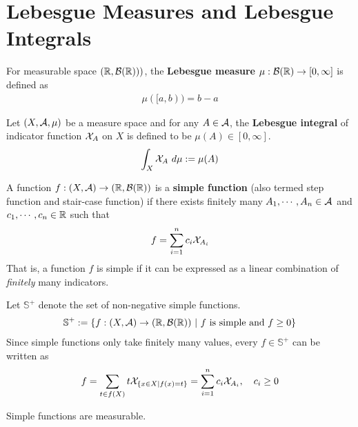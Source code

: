\documentclass[11pt]{article}
\numberwithin{equation}{section}
\begin{document}
	\section{Lebesgue Measures and Lebesgue Integrals}
	\begin{definition}
	    For measurable space $(\mathbb{R}, \mathcal{{B}}(\mathbb{R})))$, the \textbf{Lebesgue measure} $\mu: \mathcal{{B}}(\mathbb{R}) \to [0, \infty]$ is defined as
	    \begin{align}
	        \mu([a, b)) = b - a
	    \end{align}
	\end{definition}
	
	\begin{definition}
		Let $(X, \mathcal{{A}}, \mu)$ be a measure space and for any $A \in \mathcal{{A}}$, the \textbf{Lebesgue integral} of indicator function $\mathcal{{X}}_A$ on $X$ is defined to be $\mu(A) \in [0, \infty]$.
		\begin{align}
			\int_X \mathcal{{X}}_A\ d\mu := \mu(A)
		\end{align}
	\end{definition}
	
	\begin{definition}
		A function $f: (X, \mathcal{{A}}) \to (\mathbb{R}, \mathcal{{B}}(\mathbb{R}))$ is a \textbf{simple function} (also termed step function and stair-case function) if there exists finitely many $A_1, \cdots, A_n \in \mathcal{{A}}$ and $c_1, \cdots, c_n \in \mathbb{R}$ such that
		\begin{align}
			f = \sum_{i=1}^n c_i \mathcal{{X}}_{A_i}
		\end{align}
		That is, a function $f$ is simple if it can be expressed as a linear combination of \emph{finitely} many indicators.
		
		Let $\mathbb{S}^+$ denote the set of non-negative simple functions.
		\begin{align}
			\mathbb{S}^+ := \left\{
				f: (X, \mathcal{{A}}) \to (\mathbb{R}, \mathcal{{B}}(\mathbb{R}))\ \vert\ f \text{{ is simple and }} f \geq 0
			\right\}
		\end{align}
		Since simple functions only take finitely many values, every $f \in \mathbb{S}^+$ can be written as
		\begin{align}
			f = \sum_{t \in f(X)} t \mathcal{{X}}_{\{x\in X|f(x) = t\}} = \sum_{i=1}^n c_i \mathcal{{X}}_{A_i}, \quad c_i \geq 0
		\end{align}
	\end{definition}
	
	\begin{theorem}
		Simple functions are measurable.
	\end{theorem}
\end{document}
